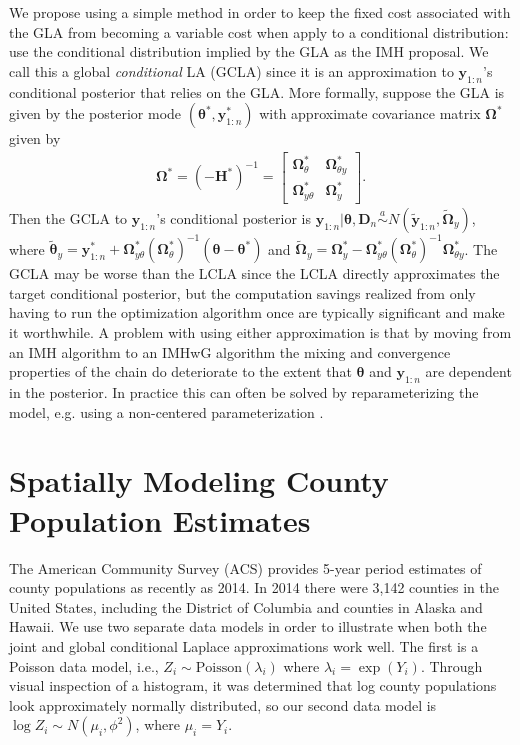 \documentclass[12pt]{article}
\begin{document}
We propose using a simple method in order to keep the fixed cost associated with the GLA from becoming a variable cost when apply to a conditional distribution: use the conditional distribution implied by the GLA as the IMH proposal. We call this a global \emph{conditional} LA (GCLA) since it is an approximation to $\bm{y}_{1:n}$'s conditional posterior that relies on the GLA. More formally, suppose the GLA is given by the posterior mode $(\bm{\theta}^*, \bm{y}_{1:n}^*)$ with approximate covariance matrix $\bm{\Omega}^*$ given by
\begin{align*}
\bm{\Omega}^* = (-\bm{H}^*)^{-1} = \begin{bmatrix} \bm{\Omega}^*_{\theta} & \bm{\Omega}^*_{\theta y} \\ \bm{\Omega}^*_{y \theta} & \bm{\Omega}^*_{y} \end{bmatrix}.
\end{align*}
Then the GCLA to $\bm{y}_{1:n}$'s conditional posterior is $\bm{y}_{1:n}|\bm{\theta},\bm{D}_n \stackrel{a}{\sim} N(\widetilde{\bm{y}}_{1:n}, \widetilde{\bm{\Omega}}_{y})$, where $\widetilde{\bm{\theta}}_y = \bm{y}_{1:n}^* + \bm{\Omega}_{y\theta}^*(\bm{\Omega}_{\theta}^*)^{-1}(\bm{\theta} - \bm{\theta}^*)$ and $\widetilde{\bm{\Omega}}_{y} = \bm{\Omega}_{y}^* - \bm{\Omega}_{y\theta}^*(\bm{\Omega}_{\theta}^*)^{-1}\bm{\Omega}_{\theta y}^*$. The GCLA may be worse than the LCLA since the LCLA directly approximates the target conditional posterior, but the computation savings realized from only having to run the optimization algorithm once are typically significant and make it worthwhile. A problem with using either approximation is that by moving from an IMH algorithm to an IMHwG algorithm the mixing and convergence properties of the chain do deteriorate to the extent that $\bm{\theta}$ and $\bm{y}_{1:n}$ are dependent in the posterior. In practice this can often be solved by reparameterizing the model, e.g. using a non-centered parameterization \citep{gelfand1995efficient,roberts1997updating,van2001art,bernardo2003non}.




\section{Spatially Modeling County Population Estimates}\label{sec:pop}
The American Community Survey (ACS) provides 5-year period estimates of county populations as recently as 2014. In 2014 there were 3,142 counties in the United States, including the District of Columbia and counties in Alaska and Hawaii.  We use two separate data models in order to illustrate when both the joint and global conditional Laplace approximations work well. The first is a Poisson data model, i.e., $Z_i \sim \mathrm{Poisson}(\lambda_i)$ where $\lambda_i = \exp(Y_i)$. Through visual inspection of a histogram, it was determined that log county populations look approximately normally distributed, so our second data model is $\log Z_i \sim N(\mu_i, \phi^2)$, where $\mu_i = Y_i$.
\end{document}
